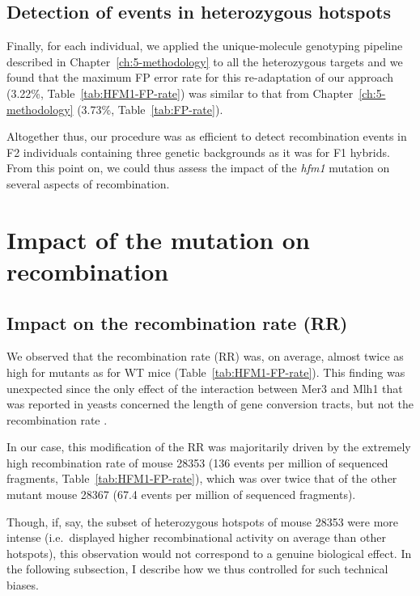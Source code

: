 \subsection{Detection of events in heterozygous hotspots}

Finally, for each individual, we applied the unique-molecule genotyping pipeline described in Chapter~\ref{ch:5-methodology} to all the heterozygous targets and we found that the maximum FP error rate for this re-adaptation of our approach (3.22\%, Table~\ref{tab:HFM1-FP-rate}) was similar to that from Chapter~\ref{ch:5-methodology} (3.73\%, Table~\ref{tab:FP-rate}).

Altogether thus, our procedure was as efficient to detect recombination events in F2 individuals containing three genetic backgrounds as it was for F1 hybrids.
From this point on, we could thus assess the impact of the \textit{hfm1} mutation on several aspects of recombination.







\section{Impact of the mutation on recombination}
\subsection{Impact on the recombination rate (RR)}
\label{chap8:recombination-rate}

We observed that the recombination rate (RR) was, on average, almost twice as high for mutants as for WT mice (Table~\ref{tab:HFM1-FP-rate}).
This finding was unexpected since the only effect of the interaction between Mer3 and Mlh1 that was reported in yeasts concerned the length of gene conversion tracts, but not the recombination rate \citep{duroc2017concerted}.

In our case, this modification of the RR was majoritarily driven by the extremely high recombination rate of mouse 28353 (136 events per million of sequenced fragments, Table~\ref{tab:HFM1-FP-rate}), which was over twice that of the other mutant mouse 28367 (67.4 events per million of sequenced fragments).

Though, if, say, the subset of heterozygous hotspots of mouse 28353 were more intense (i.e.\ displayed higher recombinational activity on average than other hotspots), this observation would not correspond to a genuine biological effect.
In the following subsection, I describe how we thus controlled for such technical biases.



